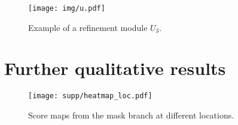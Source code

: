 \documentclass[10pt,twocolumn,letterpaper]{article}
\begin{document}
\renewcommand\arraystretch{1.1}
\setlength{\tabcolsep}{2pt}
\begin{table}
\begin{center}
\end{center}
\caption{Architectural details of the \textit{three-branch} head.
$k$ denotes the number of anchor boxes per RoW.
}
\label{tab:three}
\vspace{-0.2cm}
\end{table}





\renewcommand\arraystretch{1.1}
\setlength{\tabcolsep}{2pt}
\begin{table}
\begin{center}
\end{center}
\caption{Architectural details of the \textit{two-branch} head.
}
\label{tab:two}
\vspace{-0.2cm}
\end{table}


\begin{figure}
\begin{center}
\texttt{[image: img/u.pdf]}
\end{center}
\vspace{-0.2cm}
\caption{Example of a refinement module $U_3$.}
\label{fig:u}
\end{figure}

\section{Further qualitative results}
\label{sec:appendix_qualitative}
\begin{figure}
\begin{center}
\texttt{[image: supp/heatmap\_loc.pdf]}
\end{center}
\vspace{-0.2cm}
\caption{Score maps from the mask branch at different locations.}
\label{fig:map}
\end{figure}
\end{document}
